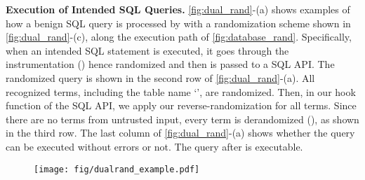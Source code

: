 \noindent
{\bf Execution of Intended SQL Queries.}
\autoref{fig:dual_rand}-(a) shows examples of how a benign SQL query is processed by \sysname with a randomization scheme shown in \autoref{fig:dual_rand}-(c), along the execution path of \autoref{fig:database_rand}.
Specifically, when an intended SQL statement is executed, it goes through the instrumentation () hence randomized and then is passed to a SQL API. 
The randomized query is shown in the second row of \autoref{fig:dual_rand}-(a). All recognized terms, including the table name `', are randomized.
Then, in our hook function of the SQL API, we apply our reverse-randomization for all terms. Since there are no terms from untrusted input, every term is derandomized (), as shown in the third row.
The last column of \autoref{fig:dual_rand}-(a) shows whether the query can be executed without errors or not. The query after  is executable.

\begin{figure}[!t]
    \centering
    \texttt{[image: fig/dualrand\_example.pdf]}
    \vspace{-1em}
    \caption{}
    \vspace{-2em}
    \label{fig:dual_rand}
\end{figure}

